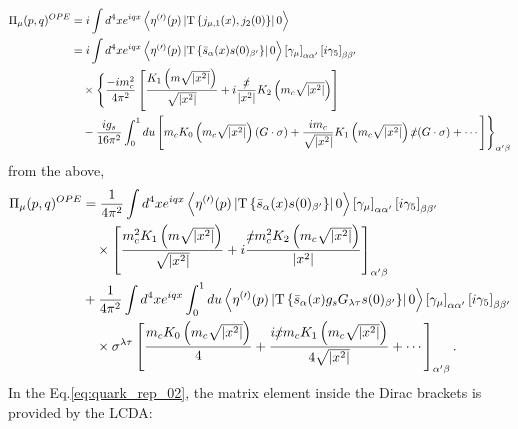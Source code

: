 \begin{equation}
    \begin{aligned}
        \Pi_\mu(p, q)^{OPE} & = i \int d^4 x e^{i q x}\left\langle \eta^{(\prime)}(p)\left|\mathrm{T}\left\{j_{\mu,1}(x), j_{2}(0)\right\}\right| 0\right\rangle                                                                                                                        \\
                            & = i \int d^4 x e^{i q x}\left\langle \eta^{(\prime)}(p)\left| \mathrm{T}\left\{\bar{s}_{\alpha}(x)s(0)_{\beta^{\prime}}\right\} \right| 0\right\rangle  \left[\gamma_{\mu}\right]_{\alpha\alpha^{\prime}} \left[i \gamma_{5}\right]_{\beta\beta^{\prime}} \\
                            & \quad \times \Biggl\{ \frac{-i m_c^2}{4 \pi^2}\left[\frac{K_1\left(m \sqrt{|x^2|}\right)}{\sqrt{|x^2|}}+i \frac{\slashed{x}}{|x^2|} K_2\left(m_c \sqrt{|x^2|}\right)\right]                                                                               \\
                            & \quad -\frac{i g_s}{16 \pi^2} \int_0^1 d u\left[m_c K_0\left(m_c \sqrt{\left| x^2\right|}\right)(G \cdot \sigma)+\frac{i m_c}{\sqrt{|x^2|}} K_1\left(m_c \sqrt{|x^2|}\right)\slashed{x} (G \cdot \sigma) + \cdots\right]  \Biggr\}_{\alpha^{\prime}\beta}
    \end{aligned}
    \label{eq:quark_rep_01}
\end{equation}
from the above,
\begin{equation}
    \begin{aligned}
        \Pi_\mu(p, q)^{OPE} & = \frac{1}{4 \pi^2} \int d^4 x e^{i q x}\left\langle \eta^{(\prime)}(p)\left| \mathrm{T}\left\{\bar{s}_{\alpha}(x)s(0)_{\beta^{\prime}}\right\} \right| 0\right\rangle  \left[\gamma_{\mu}\right]_{\alpha\alpha^{\prime}} \left[i \gamma_{5}\right]_{\beta\beta^{\prime}}                                    \\
                            & \quad \times \left[\frac{m_c^{2}K_1\left(m \sqrt{|x^2|}\right)}{\sqrt{|x^2|}} + i \frac{ \slashed{x} m_c^{2}K_2\left(m_c \sqrt{|x^2|}\right)}{|x^2|}\right]_{\alpha^{\prime}\beta}                                                                                                                           \\
                            & + \frac{1}{4 \pi^2} \int d^4 x e^{i q x} \int_0^1 d u\left\langle \eta^{(\prime)}(p)\left| \mathrm{T}\left\{\bar{s}_{\alpha}(x) g_s G_{\lambda \tau} s(0)_{\beta^{\prime}}\right\} \right| 0\right\rangle  \left[\gamma_{\mu}\right]_{\alpha\alpha^{\prime}} \left[i \gamma_{5}\right]_{\beta\beta^{\prime}} \\
                            & \quad \times  \sigma^{\lambda \tau} \left[ \frac{m_c K_0\left(m_c \sqrt{\left| x^2\right|}\right)}{4} + \frac{i \slashed{x} m_c K_1\left(m_c \sqrt{|x^2|}\right)}{4\sqrt{|x^2|}} + \cdots \right]_{\alpha^{\prime}\beta}.
    \end{aligned}
    \label{eq:quark_rep_02}
\end{equation}
In the Eq.\ref{eq:quark_rep_02}, the matrix element inside the Dirac brackets is provided by the LCDA\cite{BallBraunLenz2006}:

